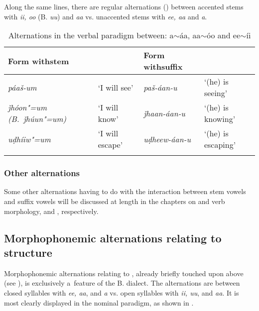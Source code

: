 Along the same lines, there are regular alternations () between accented stems with \textit{ii, oo} (B. \textit{uu}) and \textit{aa} vs. unaccented stems with \textit{ee, aa} and \textit{a}.



\begin{table}[ht]
\caption{Alternations in the verbal paradigm between: a$\sim$áa, aa$\sim$óo and ee$\sim$íi}
\begin{tabularx}{\textwidth}{ Q l Q l }
\lsptoprule
Form with\newline stem  &
&
Form with\newline suffix  &
\\\hline
\textit{páaš-um} &
`I will see' &
\textit{paš-áan-u} &
`(he) is seeing'\\
\textit{ǰhóon"=um (B.~ǰhúun"=um)} &
`I will know' &
\textit{ǰhaan-áan-u} &
`(he) is knowing'\\
\textit{uḍhíiw"=um} &
`I will escape' &
\textit{uḍheew-áan-u} &
`(he) is escaping'\\\lspbottomrule
\end{tabularx}
\label{tab:3-14}
\end{table}

\subsubsection*{Other alternations}

Some other alternations having to do with the interaction between stem vowels and suffix vowels will
be discussed at length in the chapters on  and verb morphology,  and
, respectively.

\subsection{Morphophonemic alternations relating to  structure}
\label{subsec:3-5-2}


Morphophonemic alternations relating to , already briefly touched upon above (see ), is exclusively a~feature of the B. dialect. The alternations are between closed syllables with \textit{ee, aa}, and \textit{a} vs. open syllables with \textit{ii, uu}, and \textit{aa}. It is most clearly displayed in the nominal paradigm, as shown in .



